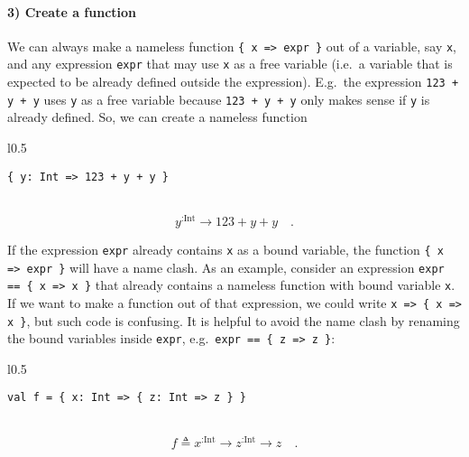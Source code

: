 \paragraph{3) Create a function}

We can always make a nameless function \lstinline!{ x => expr }!
out of a variable, say \lstinline!x!, and any expression \lstinline!expr!
that may use \lstinline!x! as a free variable (i.e.~a variable that
is expected to be already defined outside the expression). E.g.~the
expression \lstinline!123 + y + y! uses \lstinline!y! as a free
variable because \lstinline!123 + y + y! only makes sense if \lstinline!y!
is already defined. So, we can create a nameless function

\begin{wrapfigure}{l}{0.5\columnwidth}%
\vspace{-0.65\baselineskip}
\begin{lstlisting}
{ y: Int => 123 + y + y }
\end{lstlisting}

\vspace{-0.25\baselineskip}
\end{wrapfigure}%

~\vspace{-0.35\baselineskip}
\[
y^{:\text{Int}}\rightarrow123+y+y\quad.
\]
\vspace{-0.85\baselineskip}

If the expression \lstinline!expr! already contains \lstinline!x!
as a bound variable, the function \lstinline!{ x => expr }! will
have a name clash. As an example, consider an expression \lstinline!expr == { x => x }!
that already contains a nameless function with bound variable \lstinline!x!.
If we want to make a function out of that expression, we could write
\lstinline!x => { x => x }!, but such code is confusing. It is helpful
to avoid the name clash by renaming the bound variables inside \lstinline!expr!,
e.g.~\lstinline!expr == { z => z }!:

\begin{wrapfigure}{l}{0.5\columnwidth}%
\vspace{-0.65\baselineskip}
\begin{lstlisting}
val f = { x: Int => { z: Int => z } }
\end{lstlisting}

\vspace{-0.25\baselineskip}
\end{wrapfigure}%

~\vspace{-0.35\baselineskip}
\[
f\triangleq x^{:\text{Int}}\rightarrow z^{:\text{Int}}\rightarrow z\quad.
\]
\vspace{-0.85\baselineskip}


